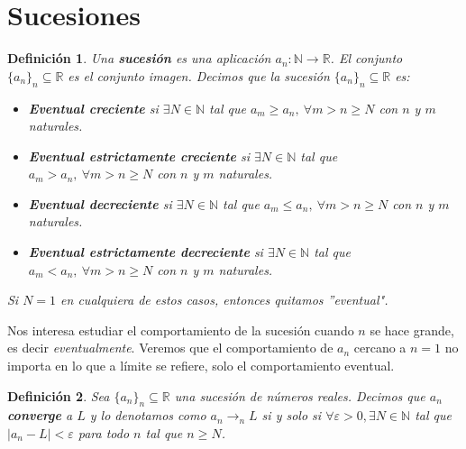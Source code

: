 \documentclass{article}
\newtheorem{define}{Definición}
\begin{document}
\renewcommand{\tablename}{Tabla} 
\section{Sucesiones}




\begin{define}
	Una \textbf{sucesión} es una aplicación $a_n: \mathbb{N} \rightarrow \mathbb{R}$. El conjunto $\{a_n\}_n \subseteq \mathbb{R}$ es el conjunto imagen. Decimos que la sucesión
	$\{a_n\}_n \subseteq \mathbb{R}$ es:
	\begin{itemize}
		\item
		\textbf{Eventual creciente} si $\exists N \in \mathbb{N}$ tal que $a_m \geq a_n,\ \forall m>n\geq N$ con $n$ y $m$ naturales.
		\item
		\textbf{Eventual estrictamente creciente} si $\exists N \in \mathbb{N}$ tal que $a_m > a_n,\ \forall m>n\geq N$ con $n$ y $m$ naturales.
		\item
		\textbf{Eventual decreciente} si $\exists N \in \mathbb{N}$ tal que $a_m \leq a_n,\ \forall m>n\geq N$ con $n$ y $m$ naturales.
		\item
		\textbf{Eventual estrictamente decreciente} si $\exists N \in \mathbb{N}$ tal que $a_m < a_n,\ \forall m>n\geq N$ con $n$ y $m$ naturales.
	\end{itemize}
	Si $N = 1$ en cualquiera de estos casos, entonces quitamos ''eventual".
\end{define}
Nos interesa estudiar el comportamiento de la sucesión cuando $n$ se hace grande, es decir \textit{eventualmente}. Veremos que el comportamiento de $a_n$ cercano a $n = 1$ no importa
en lo que a límite se refiere, solo el comportamiento eventual.


\begin{define}
	Sea $\{ a_n\}_n \subseteq \mathbb{R}$ una sucesión de números reales. Decimos que $a_n$ \textbf{converge} a $L$ y lo denotamos como $a_n \rightarrow_{n} L$ si y solo si 
	$\forall \varepsilon > 0,\exists N \in \mathbb{N}$ tal que $|a_n - L| < \varepsilon$ para todo $n$ tal que $n \geq N$.
\end{define}
\end{document}
